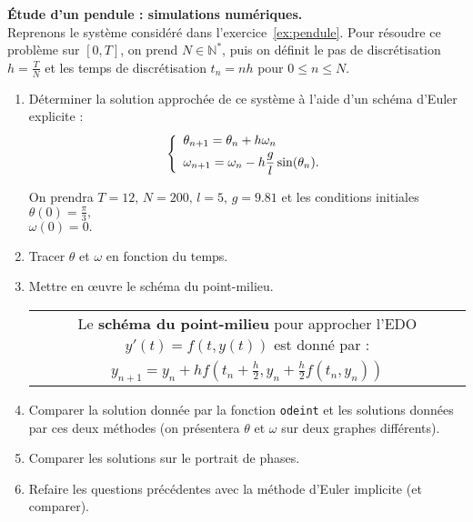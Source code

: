 \documentclass[12pt]{article}
\begin{document}
\begin{exo}\textbf{\'Etude d'un pendule : simulations num\'eriques.}
  \label{ex:pt_milieu}
  \\
  Reprenons le syst\`eme consid\'er\'e dans l'exercice~\ref{ex:pendule}.
Pour r\'esoudre ce probl\`eme sur $[0,T]$, on prend $N \in \mathbb{N}^*$, puis on d\'efinit le pas de discr\'etisation $h=\frac TN$ et  les temps de discr\'etisation $t_n=nh$ pour $0 \leq n \leq N$.  


\begin{enumerate}
\item D\'eterminer la solution approch\'ee de ce syst\`eme \`a l'aide d'un sch\'ema d'Euler explicite :
\begin{equation*}
\left\{
\begin{array}{l}
\theta_{n+1}=\theta_n+h\omega_{n}\vspace{0.1cm}\\
\omega_{n+1}=\omega_n-h\displaystyle\frac{g}{l}\sin(\theta_{n}).
\end{array}
\right.
\end{equation*}

On prendra $T=12,\, N=200,\,l=5,\,g=9.81$
et les conditions initiales 
$\theta(0)=\frac{\pi}{3},\,$ \\ $\omega(0)=0.$
\item Tracer $\theta$ et $\omega$ en fonction du temps.
\item Mettre en \oe uvre le sch\'ema du point-milieu. \vspace{0.2cm}\\
\begin{tabular}{|c|}
 \hline
Le \textbf{sch\'ema du point-milieu} pour approcher l'EDO $y'(t)=f(t,y(t))$ est donn\'e par :\\
$y_{n+1}=y_n+h f\displaystyle\left(t_n+\frac h2,y_n+\frac h2 f(t_n,y_n)\right)$\\
 \hline
\end{tabular}
\item Comparer  la solution donn\'ee par la fonction \texttt{odeint} et les solutions donn\'ees par ces deux méthodes (on pr\'esentera $\theta$ et $\omega$ sur deux graphes diff\'erents). 
\item Comparer les solutions sur le portrait de phases.
\item Refaire les questions pr\'ec\'edentes avec la m\'ethode d'Euler implicite (et comparer).
\end{enumerate}



 
\end{exo}
\end{document}
